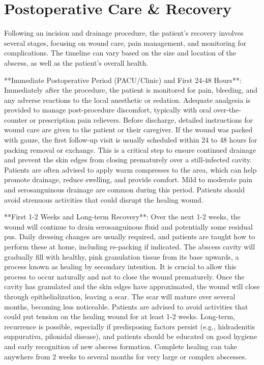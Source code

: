 \section*{Postoperative Care \& Recovery}
Following an incision and drainage procedure, the patient's recovery involves several stages, focusing on wound care, pain management, and monitoring for complications. The timeline can vary based on the size and location of the abscess, as well as the patient's overall health.

**Immediate Postoperative Period (PACU/Clinic) and First 24-48 Hours**: Immediately after the procedure, the patient is monitored for pain, bleeding, and any adverse reactions to the local anesthetic or sedation. Adequate analgesia is provided to manage post-procedure discomfort, typically with oral over-the-counter or prescription pain relievers. Before discharge, detailed instructions for wound care are given to the patient or their caregiver. If the wound was packed with gauze, the first follow-up visit is usually scheduled within 24 to 48 hours for packing removal or exchange. This is a critical step to ensure continued drainage and prevent the skin edges from closing prematurely over a still-infected cavity. Patients are often advised to apply warm compresses to the area, which can help promote drainage, reduce swelling, and provide comfort. Mild to moderate pain and serosanguinous drainage are common during this period. Patients should avoid strenuous activities that could disrupt the healing wound.

**First 1-2 Weeks and Long-term Recovery**: Over the next 1-2 weeks, the wound will continue to drain serosanguinous fluid and potentially some residual pus. Daily dressing changes are usually required, and patients are taught how to perform these at home, including re-packing if indicated. The abscess cavity will gradually fill with healthy, pink granulation tissue from its base upwards, a process known as healing by secondary intention. It is crucial to allow this process to occur naturally and not to close the wound prematurely. Once the cavity has granulated and the skin edges have approximated, the wound will close through epithelialization, leaving a scar. The scar will mature over several months, becoming less noticeable. Patients are advised to avoid activities that could put tension on the healing wound for at least 1-2 weeks. Long-term, recurrence is possible, especially if predisposing factors persist (e.g., hidradenitis suppurativa, pilonidal disease), and patients should be educated on good hygiene and early recognition of new abscess formation. Complete healing can take anywhere from 2 weeks to several months for very large or complex abscesses.

